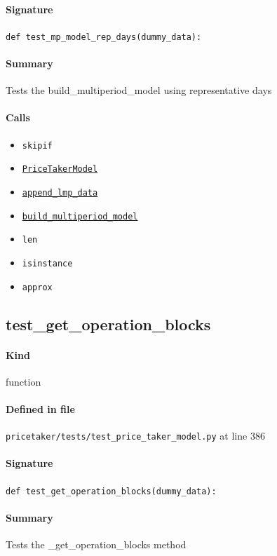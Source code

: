 \documentclass[11pt]{report}
\begin{document}
\paragraph{Signature} \texttt{def test\_mp\_model\_rep\_days(dummy\_data):}
\paragraph{Summary} Tests the build\_multiperiod\_model using representative days
\paragraph{Calls}
\begin{itemize}[leftmargin=*]
  \item \texttt{skipif}
  \item \hyperref[def:pricetaker-price_taker_model.py:PriceTakerModel:L161]{\texttt{PriceTakerModel}}
  \item \hyperref[def:pricetaker-price_taker_model.py:PriceTakerModel.append_lmp_data:L221]{\texttt{append\_lmp\_data}}
  \item \hyperref[def:pricetaker-price_taker_model.py:PriceTakerModel.build_multiperiod_model:L291]{\texttt{build\_multiperiod\_model}}
  \item \texttt{len}
  \item \texttt{isinstance}
  \item \texttt{approx}
\end{itemize}
\subsection{test\_get\_operation\_blocks}
\label{def:pricetaker-tests-test_price_taker_model.py:test_get_operation_blocks:L386}
\paragraph{Kind} function
\paragraph{Defined in file} \texttt{pricetaker/tests/test\_price\_taker\_model.py} at line 386
\paragraph{Signature} \texttt{def test\_get\_operation\_blocks(dummy\_data):}
\paragraph{Summary} Tests the \_get\_operation\_blocks method
\end{document}
